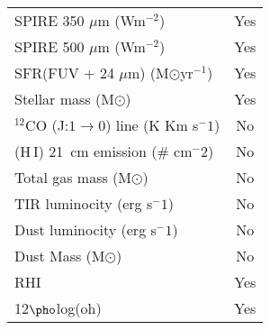 \begin{table}
\begin{tabular}{ |l|c| }
SPIRE 350 $\mu$m (Wm$^{-2}$)& Yes\\
SPIRE 500 $\mu$m (Wm$^{-2}$)& Yes\\
SFR(FUV + 24 $\mu$m) (M$\odot$yr$^{-1}$) & Yes\\
Stellar mass (M$\odot$)& Yes\\
$^{12}$CO (J:$1\rightarrow0$) line (K Km s$^-1$) & No \\
(H\,{\sc I}) 21~cm emission (# cm$^-2$) & No \\
Total gas mass (M$\odot$) & No \\
TIR luminocity (erg s$^-1$) & No \\
Dust luminocity (erg s$^-1$) & No \\
Dust Mass (M$\odot$)& No\\
RHI & Yes\\
12$\pho$log(oh)& Yes\\
\hline
\end{tabular}
\end{table}